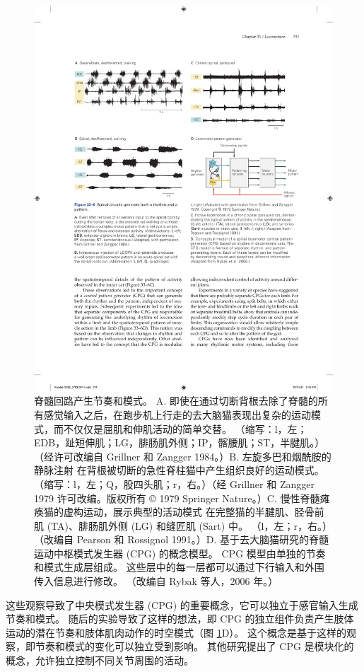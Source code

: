\begin{figure}[htbp]
	\centering
	\includegraphics[width=0.95\linewidth]{chap33/fig_33_6}
	\caption{脊髓回路产生节奏和模式。 A. 即使在通过切断背根去除了脊髓的所有感觉输入之后，在跑步机上行走的去大脑猫表现出复杂的运动模式，而不仅仅是屈肌和伸肌活动的简单交替。 （缩写：l，左；EDB，趾短伸肌；LG，腓肠肌外侧；IP，髂腰肌；ST，半腱肌。）（经许可改编自 Grillner 和 Zangger 1984。）B. 左旋多巴和烟酰胺的静脉注射 在背根被切断的急性脊柱猫中产生组织良好的运动模式。 （缩写：l，左；Q，股四头肌；r，右。）（经 Grillner 和 Zangger 1979 许可改编。版权所有 © 1979 Springer Nature。）C. 慢性脊髓瘫痪猫的虚构运动，展示典型的活动模式 在完整猫的半腱肌、胫骨前肌 (TA)、腓肠肌外侧 (LG) 和缝匠肌 (Sart) 中。 （l，左；r，右。）（改编自 Pearson 和 Rossignol 1991。）D. 基于去大脑猫研究的脊髓运动中枢模式发生器 (CPG) 的概念模型。 CPG 模型由单独的节奏和模式生成层组成。 这些层中的每一层都可以通过下行输入和外围传入信息进行修改。 （改编自 Rybak 等人，2006 年。）}
	\label{fig:33_6}
\end{figure}

这些观察导致了中央模式发生器 (CPG) 的重要概念，它可以独立于感官输入生成节奏和模式。 随后的实验导致了这样的想法，即 CPG 的独立组件负责产生肢体运动的潜在节奏和肢体肌肉动作的时空模式（图 \ref{fig:33_6}D）。 这个概念是基于这样的观察，即节奏和模式的变化可以独立受到影响。 其他研究提出了 CPG 是模块化的概念，允许独立控制不同关节周围的活动。

